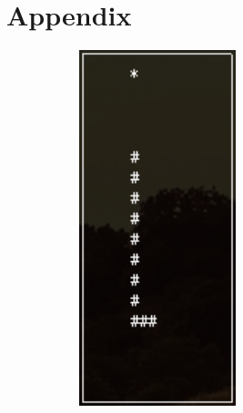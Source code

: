 \documentclass{article}
\begin{document}
\newpage
\raggedright
{}


\newpage
\section{Appendix}

\begin{figure}[h]
\centering
\begin{subfigure}{0.4\textwidth}
\centering
\includegraphics[width=0.5\textwidth]{Figures/game_board_1}
\label{fig:game_board_1}
\end{subfigure}%
\begin{subfigure}{0.4\textwidth}
\centering

\end{subfigure}
\end{figure}
\end{document}
